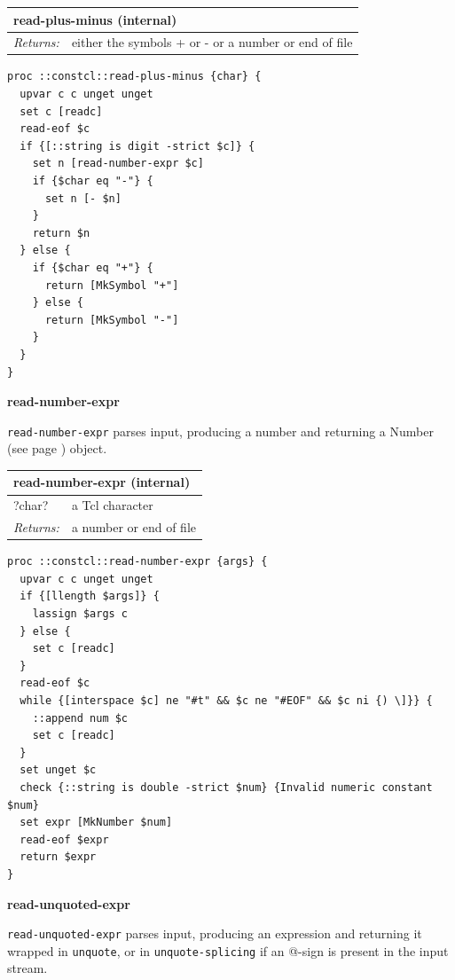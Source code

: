 \documentclass[twoside,9pt]{report}
\begin{document}
\begin{tabular}{ |l l| }
\hline
\multicolumn{2}{|l|}{read-plus-minus (internal)} \\
\hline
\textit{Returns:} & either the symbols + or - or a number or end of file \\
\hline
\end{tabular}

\noindent\makebox[\linewidth]{\rule{\linewidth}{0.4pt}}
\begin{lstlisting}
proc ::constcl::read-plus-minus {char} {
  upvar c c unget unget
  set c [readc]
  read-eof $c
  if {[::string is digit -strict $c]} {
    set n [read-number-expr $c]
    if {$char eq "-"} {
      set n [- $n]
    }
    return $n
  } else {
    if {$char eq "+"} {
      return [MkSymbol "+"]
    } else {
      return [MkSymbol "-"]
    }
  }
}
\end{lstlisting}
\noindent\makebox[\linewidth]{\rule{\linewidth}{0.4pt}}

\textbf{read-number-expr}


\texttt{read-number-expr} parses input, producing a number and returning a Number (see page \pageref{numbers}) object.

\begin{tabular}{ |l l| }
\hline
\multicolumn{2}{|l|}{read-number-expr (internal)} \\
\hline
?char? & a Tcl character \\
\textit{Returns:} & a number or end of file \\
\hline
\end{tabular}

\noindent\makebox[\linewidth]{\rule{\linewidth}{0.4pt}}
\begin{lstlisting}
proc ::constcl::read-number-expr {args} {
  upvar c c unget unget
  if {[llength $args]} {
    lassign $args c
  } else {
    set c [readc]
  }
  read-eof $c
  while {[interspace $c] ne "#t" && $c ne "#EOF" && $c ni {) \]}} {
    ::append num $c
    set c [readc]
  }
  set unget $c
  check {::string is double -strict $num} {Invalid numeric constant $num}
  set expr [MkNumber $num]
  read-eof $expr
  return $expr
}
\end{lstlisting}
\noindent\makebox[\linewidth]{\rule{\linewidth}{0.4pt}}

\textbf{read-unquoted-expr}


\texttt{read-unquoted-expr} parses input, producing an expression and returning it wrapped in \texttt{unquote}, or in \texttt{unquote-splicing} if an @-sign is present in the input stream.
\end{document}
